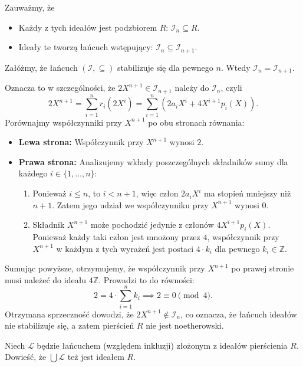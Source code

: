 \begin{solution}
	Zauważmy, że
	\begin{itemize}
		\item Każdy z tych ideałów jest podzbiorem $R$:  $\mathcal{I}_{n} \subseteq R$.
		\item Ideały te tworzą łańcuch wstępujący: $\mathcal{I}_{n} \subseteq \mathcal{I}_{n+1}$.
	\end{itemize}

	Załóżmy, że łańcuch $\left( \mathcal{I}, \subseteq  \right) $ stabilizuje się dla pewnego $n$. Wtedy $\mathcal{I}_{n} = \mathcal{I}_{n+1}$.

	Oznacza to w szczególności, że  $2X^{n+1} \in \mathcal{I}_{n+1}$ należy do $\mathcal{I}_{n}$, czyli
	\[
	2X^{n+1} = \sum_{i=1}^{n} r_i (2X^i) = \sum_{i=1}^{n} \left( 2a_i X^i + 4X^{i+1} p_i(X) \right)
	.\] 
Porównajmy współczynniki przy $X^{n+1}$ po obu stronach równania:
\begin{itemize}
    \item \textbf{Lewa strona:} Współczynnik przy $X^{n+1}$ wynosi $2$.
    \item \textbf{Prawa strona:} Analizujemy wkłady poszczególnych składników sumy dla każdego $i \in \{1, \dots, n\}$:
    \begin{enumerate}[label=(\roman*)]
        \item Ponieważ $i \le n$, to $i < n+1$, więc człon $2a_i X^i$ ma stopień mniejszy niż $n+1$. Zatem jego udział we współczynniku przy $X^{n+1}$ wynosi $0$.
        \item Składnik $X^{n+1}$ może pochodzić jedynie z członów $4X^{i+1} p_i(X)$. Ponieważ każdy taki człon jest mnożony przez $4$, współczynnik przy $X^{n+1}$ w każdym z tych wyrażeń jest postaci $4 \cdot k_i$ dla pewnego $k_i \in \mathbb{Z}$.
    \end{enumerate}
\end{itemize}

Sumując powyższe, otrzymujemy, że współczynnik przy $X^{n+1}$ po prawej stronie musi należeć do ideału $4\mathbb{Z}$. Prowadzi to do równości:
\[
2 = 4 \cdot \sum_{i=1}^{n} k_i \implies 2 \equiv 0 \pmod{4}
.\] 
Otrzymana sprzeczność dowodzi, że $2X^{n+1} \notin \mathcal{I}_n$, co oznacza, że łańcuch ideałów nie stabilizuje się, a zatem pierścień $R$ nie jest noetherowski.

\end{solution} 
\begin{problem}[3]
	Niech $\mathcal{L}$ będzie łańcuchem (względem inkluzji) złożonym z ideałów pierścienia $R$. Dowieść, że $\bigcup \mathcal{L} $ też jest ideałem $R$.
\end{problem} 
